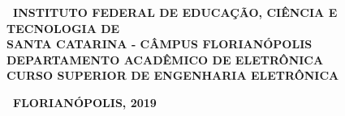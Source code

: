 \documentclass{ifscTCC} %
\begin{document}
\frenchspacing 


\begin{capa}%
    \begin{SingleSpacing}
        \center\ABNTEXchapterfont\bfseries\ INSTITUTO FEDERAL DE EDUCAÇÃO, CIÊNCIA E TECNOLOGIA DE\\SANTA CATARINA - CÂMPUS FLORIANÓPOLIS\\DEPARTAMENTO ACADÊMICO DE ELETRÔNICA\\CURSO SUPERIOR DE ENGENHARIA ELETRÔNICA
        
        \vspace*{3.0cm}     %
        
        \ABNTEXchapterfont\bfseries\MakeUppercase\imprimirautor

        \begin{vplace}[0.5]
            \begin{center}
                \ABNTEXchapterfont\SingleSpacing\bfseries\Large\MakeUppercase\imprimirtitulo
            \end{center}
        \end{vplace}
        
        \begin{center}
            \ABNTEXchapterfont\bfseries\ FLORIANÓPOLIS, 2019
        \end{center}
    \end{SingleSpacing}
\end{capa}
\end{document}
